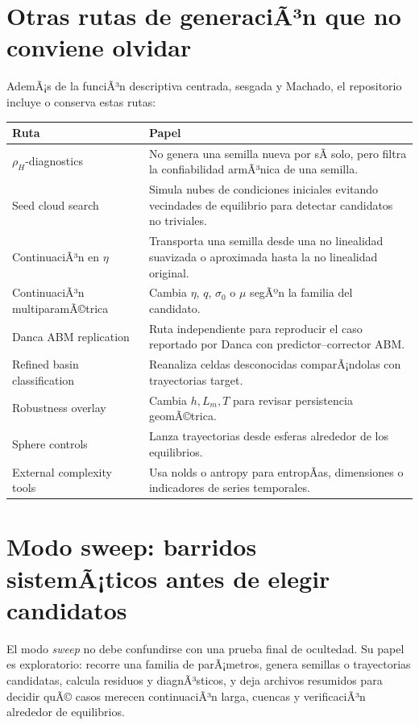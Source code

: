 \documentclass[11pt]{article}
\DeclareRobustCommand{\codepath}[1]{\begingroup\Urlmuskip=0mu plus 2mu\path{#1}\endgroup}
\def\codepath#1{#1}%
\begin{document}
\section{Otras rutas de generaciÃ³n que no conviene olvidar}

AdemÃ¡s de la funciÃ³n descriptiva centrada, sesgada y Machado, el repositorio incluye o conserva estas rutas:

\begin{center}
\small
\begin{tabular}{@{}L{0.32\textwidth}L{0.56\textwidth}@{}}
\toprule
Ruta & Papel\\
\midrule
\(\rho_H\)-diagnostics & No genera una semilla nueva por sÃ­ solo, pero filtra la confiabilidad armÃ³nica de una semilla.\\
Seed cloud search & Simula nubes de condiciones iniciales evitando vecindades de equilibrio para detectar candidatos no triviales.\\
ContinuaciÃ³n en \(\eta\) & Transporta una semilla desde una no linealidad suavizada o aproximada hasta la no linealidad original.\\
ContinuaciÃ³n multiparamÃ©trica & Cambia \(\eta\), \(q\), \(\sigma_0\) o \(\mu\) segÃºn la familia del candidato.\\
Danca ABM replication & Ruta independiente para reproducir el caso reportado por Danca con predictor--corrector ABM.\\
Refined basin classification & Reanaliza celdas desconocidas comparÃ¡ndolas con trayectorias target.\\
Robustness overlay & Cambia \(h,L_m,T\) para revisar persistencia geomÃ©trica.\\
Sphere controls & Lanza trayectorias desde esferas alrededor de los equilibrios.\\
External complexity tools & Usa \codepath{nolds} o \codepath{antropy} para entropÃ­as, dimensiones o indicadores de series temporales.\\
\bottomrule
\end{tabular}
\end{center}

\section{Modo sweep: barridos sistemÃ¡ticos antes de elegir candidatos}

El modo \emph{sweep} no debe confundirse con una prueba final de ocultedad. Su papel es exploratorio: recorre una familia de parÃ¡metros, genera semillas o trayectorias candidatas, calcula residuos y diagnÃ³sticos, y deja archivos resumidos para decidir quÃ© casos merecen continuaciÃ³n larga, cuencas y verificaciÃ³n alrededor de equilibrios.
\end{document}
